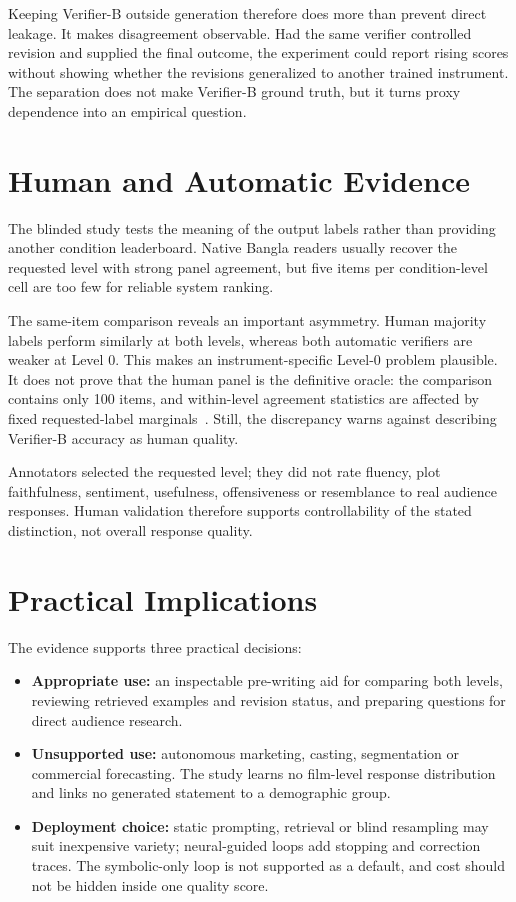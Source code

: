 Keeping Verifier-B outside generation therefore does more than prevent direct leakage. It makes disagreement observable. Had the same verifier controlled revision and supplied the final outcome, the experiment could report rising scores without showing whether the revisions generalized to another trained instrument. The separation does not make Verifier-B ground truth, but it turns proxy dependence into an empirical question.

\section{Human and Automatic Evidence}
\label{sec:ch7-human-automatic}

The blinded study tests the meaning of the output labels rather than providing another condition leaderboard. Native Bangla readers usually recover the requested level with strong panel agreement, but five items per condition-level cell are too few for reliable system ranking.

The same-item comparison reveals an important asymmetry. Human majority labels perform similarly at both levels, whereas both automatic verifiers are weaker at Level 0. This makes an instrument-specific Level-0 problem plausible. It does not prove that the human panel is the definitive oracle: the comparison contains only 100 items, and within-level agreement statistics are affected by fixed requested-label marginals~\citep{b36,b37}. Still, the discrepancy warns against describing Verifier-B accuracy as human quality.

Annotators selected the requested level; they did not rate fluency, plot faithfulness, sentiment, usefulness, offensiveness or resemblance to real audience responses. Human validation therefore supports controllability of the stated distinction, not overall response quality.

\section{Practical Implications}
\label{sec:ch7-practical-implications}

The evidence supports three practical decisions:

\begin{itemize}
    \setlength{\itemsep}{2pt}
    \setlength{\parskip}{0pt}
    \setlength{\parsep}{0pt}
    \item \textbf{Appropriate use:} an inspectable pre-writing aid for comparing both levels, reviewing retrieved examples and revision status, and preparing questions for direct audience research.
    \item \textbf{Unsupported use:} autonomous marketing, casting, segmentation or commercial forecasting. The study learns no film-level response distribution and links no generated statement to a demographic group.
    \item \textbf{Deployment choice:} static prompting, retrieval or blind resampling may suit inexpensive variety; neural-guided loops add stopping and correction traces. The symbolic-only loop is not supported as a default, and cost should not be hidden inside one quality score.
\end{itemize}

